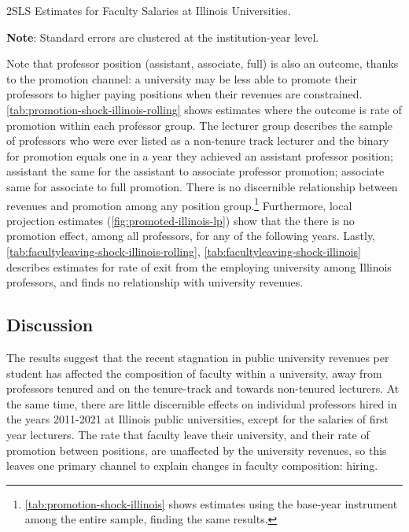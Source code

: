 \documentclass[notitlepage,12pt]{article}
\begin{document}
\begin{table}[!h]
    \singlespacing
    \centering
    \caption{2SLS Estimates for Faculty Salaries at Illinois Universities.}
    \makebox[\textwidth][c]{}
    \begin{flushleft}
        \footnotesize
        \textbf{Note}: Standard errors are clustered at the institution-year level.
    \end{flushleft}
    \label{tab:facultysalaries-shock-illinois-rolling}
\end{table}

Note that professor position (assistant, associate, full) is also an outcome, thanks to the promotion channel: a university may be less able to promote their professors to higher paying positions when their revenues are constrained.
\autoref{tab:promotion-shock-illinois-rolling} shows estimates where the outcome is rate of promotion within each professor group.
The lecturer group describes the sample of professors who were ever listed as a non-tenure track lecturer and the binary for promotion equals one in a year they achieved an assistant professor position; assistant the same for the assistant to associate professor promotion; associate same for associate to full promotion.
There is no discernible relationship between revenues and promotion among any position group.\footnote{
    \autoref{tab:promotion-shock-illinois} shows estimates using the base-year instrument among the entire sample, finding the same results.
}
Furthermore, local projection estimates (\autoref{fig:promoted-illinois-lp}) show that the there is no promotion effect, among all professors, for any of the following years.
Lastly, \autoref{tab:facultyleaving-shock-illinois-rolling}, \ref{tab:facultyleaving-shock-illinois} describes estimates for rate of exit from the employing university among Illinois professors, and finds no relationship with university revenues.

\subsection{Discussion}

The results suggest that the recent stagnation in public university revenues per student has affected the composition of faculty within a university, away from professors tenured and on the tenure-track and towards non-tenured lecturers.
At the same time, there are little discernible effects on individual professors hired in the years 2011-2021 at Illinois public universities, except for the salaries of first year lecturers.
The rate that faculty leave their university, and their rate of promotion between positions, are unaffected by the university revenues, so this leaves one primary channel to explain changes in faculty composition: hiring.
\end{document}
